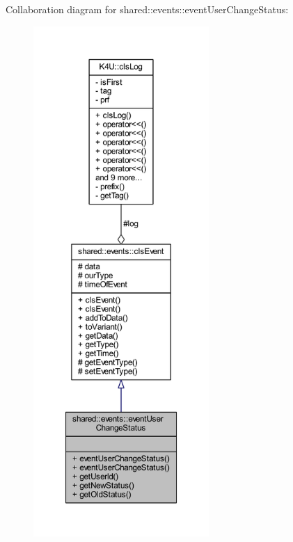 Collaboration diagram for shared\-:\-:events\-:\-:event\-User\-Change\-Status\-:\nopagebreak
\begin{figure}[H]
\begin{center}
\leavevmode
\includegraphics[height=550pt]{dc/dfb/classshared_1_1events_1_1event_user_change_status__coll__graph}
\end{center}
\end{figure}
